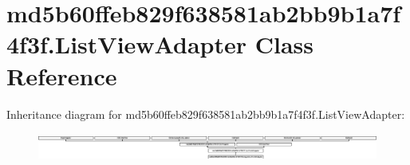\hypertarget{classmd5b60ffeb829f638581ab2bb9b1a7f4f3f_1_1ListViewAdapter}{}\section{md5b60ffeb829f638581ab2bb9b1a7f4f3f.\+List\+View\+Adapter Class Reference}
\label{classmd5b60ffeb829f638581ab2bb9b1a7f4f3f_1_1ListViewAdapter}
Inheritance diagram for md5b60ffeb829f638581ab2bb9b1a7f4f3f.\+List\+View\+Adapter\+:\begin{figure}[H]
\begin{center}
\leavevmode
\includegraphics[height=0.947547cm]{classmd5b60ffeb829f638581ab2bb9b1a7f4f3f_1_1ListViewAdapter}
\end{center}
\end{figure}
